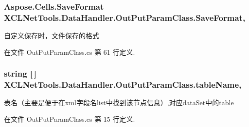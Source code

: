 \hypertarget{class_x_c_l_net_tools_1_1_data_handler_1_1_out_put_param_class_a0557dded3644a3e7bfa850c11624f015}{
\subsubsection[{Save\-Format}]{\setlength{\rightskip}{0pt plus 5cm}Aspose.\-Cells.\-Save\-Format X\-C\-L\-Net\-Tools.\-Data\-Handler.\-Out\-Put\-Param\-Class.\-Save\-Format\hspace{0.3cm}{\ttfamily [get]}, {\ttfamily [set]}}}\label{class_x_c_l_net_tools_1_1_data_handler_1_1_out_put_param_class_a0557dded3644a3e7bfa850c11624f015}


自定义保存时，文件保存的格式 



在文件 Out\-Put\-Param\-Class.\-cs 第 61 行定义.

\hypertarget{class_x_c_l_net_tools_1_1_data_handler_1_1_out_put_param_class_a7da1f957b459cb7fa6e6adcdbdaec714}{
\subsubsection[{table\-Name}]{\setlength{\rightskip}{0pt plus 5cm}string \mbox{[}$\,$\mbox{]} X\-C\-L\-Net\-Tools.\-Data\-Handler.\-Out\-Put\-Param\-Class.\-table\-Name\hspace{0.3cm}{\ttfamily [get]}, {\ttfamily [set]}}}\label{class_x_c_l_net_tools_1_1_data_handler_1_1_out_put_param_class_a7da1f957b459cb7fa6e6adcdbdaec714}


表名（主要是便于在xml字段名list中找到该节点信息）,对应data\-Set中的table 



在文件 Out\-Put\-Param\-Class.\-cs 第 15 行定义.

